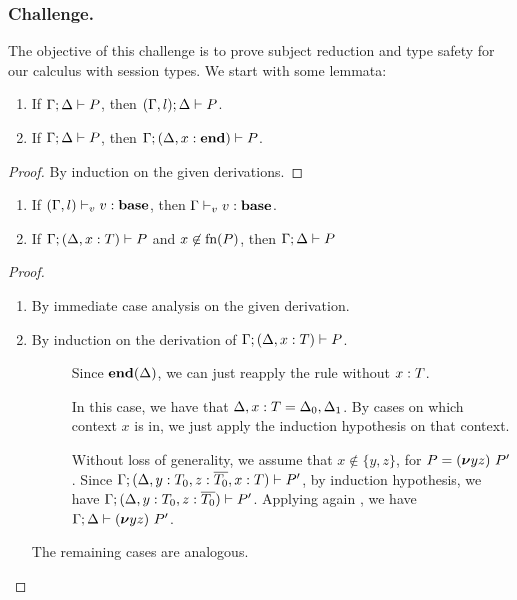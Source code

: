 \subsubsection{Challenge.}
The objective of this challenge is to prove subject reduction and type safety for our calculus with session types. We start with some lemmata:

\begin{lemma}[Weakening]\mbox{}
  \label{lemma:weak}
  \begin{enumerate}
  \item If \( \Gamma; \Delta \vdash P \), then
    \( (\Gamma, l);\Delta \vdash P \).
  \item If \( \Gamma; \Delta \vdash P \),
    then
    \( \Gamma;(\Delta, x : \mathbf{end}) \vdash P \).
  \end{enumerate}
\end{lemma}
\begin{proof}
  By induction on the given derivations.
\end{proof}
\begin{lemma}[Strengthening]\mbox{}
  \label{lemma:strenD}
  \begin{enumerate}
  \item If $(\Gamma, l) \vdash_v v : \mathbf{base}$, then
    $\Gamma \vdash_v v : \mathbf{base}$.
  \item   If \(\Gamma; (\Delta, x : T) \vdash P\) and
  $x\not\in \textrm{fn}(P)$, then \(\Gamma; \Delta \vdash P\)
\end{enumerate}
\end{lemma}
\begin{proof}
  \mbox{}
  \begin{enumerate}
  \item By immediate case analysis on the given derivation.
  \item By induction on the derivation of
  $\Gamma; (\Delta, x : T) \vdash P$.
  \begin{description}
  \item[] Since $\mathbf{end}(\Delta)$, we can just reapply
    the rule without $x : T$.

  \item[] In this case, we have that
    $\Delta, x : T = \Delta_0, \Delta_1$.  By cases on which
    context $x$ is in, we just apply the induction hypothesis on
    that context.
  \item[] Without loss of generality, we assume that
    $x \notin \{y,z\}$, for $P=(\bm{\nu} yz)~P'$. Since
    $\Gamma;(\Delta, y : T_0, z : \overline{T_0}, x : T) \vdash P'$, by
    induction hypothesis, we have
    $\Gamma;(\Delta, y : T_0, z : \overline{T_0}) \vdash P'$. Applying
    again , we have
    $\Gamma;\Delta \vdash (\bm{\nu} yz)~P'$.
  \end{description}
  The remaining cases are analogous.
\end{enumerate}
\end{proof}

